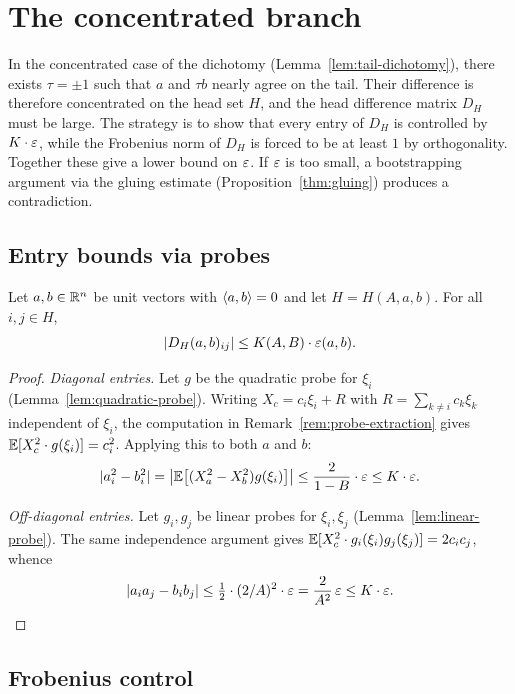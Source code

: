 \section{The concentrated branch}\label{sec:head}

In the concentrated case of the dichotomy
(Lemma~\ref{lem:tail-dichotomy}), there exists $\tau = \pm 1$ such that
$a$ and $\tau b$ nearly agree on the tail. Their difference is therefore
concentrated on the head set $H$, and the head difference matrix $D_H$
must be large. The strategy is to show that every entry of $D_H$ is
controlled by $K \cdot \varepsilon$, while the Frobenius norm of $D_H$ is forced
to be at least $1$ by orthogonality. Together these give a lower bound on
$\varepsilon$. If $\varepsilon$ is too small, a bootstrapping argument via the gluing
estimate (Proposition~\ref{thm:gluing}) produces a contradiction.

\subsection{Entry bounds via probes}

\begin{proposition}\label{thm:head-entry}
Let $a, b \in \mathbb{R}^n$ be unit vectors with $\langle a,b\rangle = 0$ and let
$H = H(A,a,b)$. For all $i, j \in H$,
\[
\lvert D_H(a,b)_{ij} \rvert \le K(A,B) \cdot \varepsilon(a,b).
\]
\end{proposition}

\begin{proof}
\emph{Diagonal entries.}
Let $g$ be the quadratic probe for $\xi_i$
(Lemma~\ref{lem:quadratic-probe}). Writing
$X_c = c_i \xi_i + R$ with $R = \sum_{k \ne i} c_k \xi_k$ independent
of $\xi_i$, the computation in Remark~\ref{rem:probe-extraction} gives
$\mathbb{E}[X_c^2 \cdot g(\xi_i)] = c_i^2$.
Applying this to both $a$ and $b$:
\[
\lvert a_i^2 - b_i^2 \rvert
= \bigl\lvert\mathbb{E}\bigl[(X_a^2 - X_b^2) g(\xi_i)\bigr]\bigr\rvert
\le \frac{2}{1-B} \cdot \varepsilon
\le K \cdot \varepsilon.
\]

\emph{Off-diagonal entries.}
Let $g_i, g_j$ be linear probes for $\xi_i, \xi_j$
(Lemma~\ref{lem:linear-probe}). The same independence argument gives
$\mathbb{E}[X_c^2 \cdot g_i(\xi_i) g_j(\xi_j)] = 2 c_i c_j$, whence
\[
\lvert a_i a_j - b_i b_j \rvert
\le \tfrac{1}{2} \cdot (2/A)^2 \cdot \varepsilon
= \frac{2}{A^2}\, \varepsilon
\le K \cdot \varepsilon. \qedhere
\]
\end{proof}

\subsection{Frobenius control}

